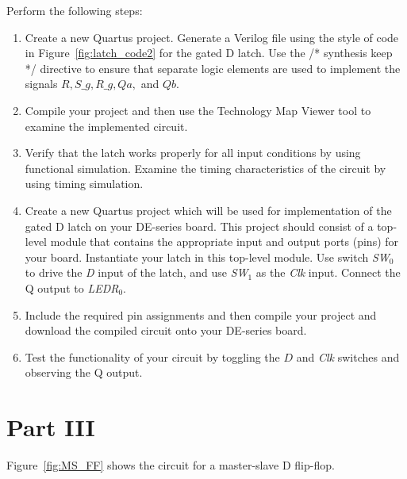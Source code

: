 \documentclass[epsfig,10pt,fullpage]{article}
\begin{document}
Perform the following steps:
\begin{enumerate}
\item Create a new Quartus project. Generate a Verilog file using the style of code 
in Figure~\ref{fig:latch_code2} for the gated D latch. 
Use the /* synthesis keep */ directive to ensure
that separate logic elements are used to implement the signals $R, S\_g, R\_g, Qa,$ and $Qb$.
\item Compile your project and then use the 
Technology Map Viewer tool to examine the implemented circuit.
\item Verify that the latch works properly for all input conditions by using functional 
simulation. Examine the timing characteristics of the circuit by using timing simulation.
\item Create a new Quartus project which will be used for implementation of the gated D
latch on your DE-series board. This project should consist of a top-level module that 
contains the appropriate input and output ports (pins) for your board. Instantiate your
latch in this top-level module. Use switch {\it SW}$_0$ to drive the {\it D} input of the latch,
and use {\it SW}$_1$ as the {\it Clk} input. Connect the Q output to {\it LEDR}$_{0}$.
\item
Include the required pin assignments and then compile your project and download the 
compiled circuit onto your DE-series board.
\item
Test the functionality of your circuit by toggling the $D$ and {\it Clk} switches and observing 
the Q output.
\end{enumerate}

\section*{Part III}
Figure~\ref{fig:MS_FF} shows the circuit for a master-slave D flip-flop.
\end{document}
